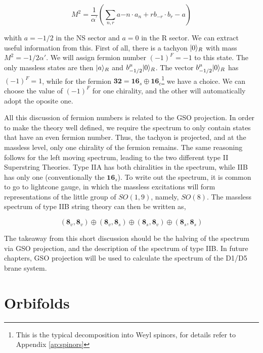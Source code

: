 
\begin{equation}
    \label{eq:mass_state}
    M^2=\frac{1}{\alpha^{\prime}}\left(\sum_{n, r} a{-n} \cdot a_n+r b_{-r} \cdot b_r-a\right)
\end{equation}

whith $a = -1/2$ in the NS sector and $a = 0$ in the R sector. We can extract useful information from this. First of all, there is a tachyon $\lvert0\rangle_R$ with mass $M^2 = -1/2\alpha '$. We will assign fermion number $(-1)^F = -1$ to this state. The only massless states are then $\lvert a\rangle_R$ and $b^\mu_{-1/2}\lvert0\rangle_R$. The vector $b^\mu_{-1/2}\lvert0\rangle_R$ has $(-1)^F = 1$, while for the fermion $\mathbf{32} = \mathbf{16}_s \oplus \mathbf{16}_c$\footnote{This is the typical decomposition into Weyl spinors, for details refer to Appendix \ref{ap:spinors}} we have a choice. We can choose the value of $(-1)^F$ for one chirality, and the other will automatically adopt the oposite one.

All this discussion of fermion numbers is related to the GSO projection. In order to make the theory well defined, we require the spectrum to only contain states that have an even fermion number. Thus, the tachyon is projected, and at the massless level, only one chirality of the fermion remains. The same reasoning follows for the left moving spectrum, leading to the two different type II Superstring Theories. Type IIA has both chiralities in the spectrum, while IIB has only one (conventionally the $\mathbf{16}_s$). To write out the spectrum, it is common to go to lightcone gauge, in which the massless excitations will form representations of the little group of $SO(1,9)$, namely, $SO(8)$. The massless spectrum of type IIB string theory can then be written as,

\begin{equation*}
    (\mathbf{8}_v, \mathbf{8}_v) \oplus (\mathbf{8}_v, \mathbf{8}_s) \oplus (\mathbf{8}_s, \mathbf{8}_v) \oplus (\mathbf{8}_s, \mathbf{8}_s)
\end{equation*}

The takeaway from this short discussion should be the halving of the spectrum via GSO projection, and the description of the spectrum of type IIB. In future chapters, GSO projection will be used to calculate the spectrum of the D1/D5 brane system.



\section{Orbifolds}


